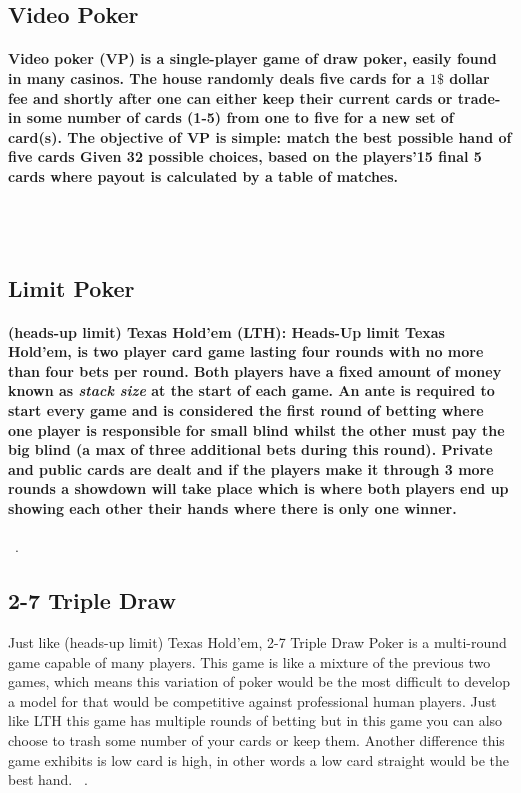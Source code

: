\documentclass[review]{elsarticle}
\begin{document}
\subsection*{Video Poker}
\paragraph{Video poker (VP) is a single-player game of draw poker, 
easily found in many casinos. The house randomly deals five cards 
for a $1\$$ dollar fee and shortly after one can either keep their 
current cards or trade-in some number of cards (1-5) from one to 
five for a new set of card(s). The objective of VP is 
simple: match the best possible hand of five cards Given 32 
possible choices, based on the players{\ttfamily\char'15} final 5 
cards where payout is calculated by a table of matches.} \\
~\cite{YakovenkoCRF15}\\

\subsection*{Limit Poker}
\paragraph{(heads-up limit) Texas Hold'em (LTH): Heads-Up limit Texas Hold'em, is two 
player card game lasting four rounds with no more than four bets per round.  
Both players have a fixed amount of money known as \textit{stack size} at 
the start of each game. An ante is required to start every game and is 
considered the first round of betting where one player is responsible for 
\textbf{small blind} whilst the other must pay the \textbf{big blind} 
(a max of three additional bets during this round). Private and public 
cards are dealt and if the players make it through 3 more rounds a showdown
will take place which is where both players end up showing each other 
their hands where there is only one winner.}
~\cite{MJohanson2013}.\\

\subsection*{2-7 Triple Draw}
Just like (heads-up limit) Texas Hold'em, 2-7 Triple Draw Poker is a 
multi-round game capable of many players. This game is like a mixture of 
the previous two games, which means this variation of poker would be 
the most difficult to develop a model for that would be competitive 
against professional human players. Just like LTH this game has multiple
rounds of betting but in this game you can also choose to trash some number
of your cards or keep them. Another difference this game exhibits is low 
card is high, in other words a low card straight would be the best hand.
~\cite{YakovenkoCRF15}. \\
\end{document}

